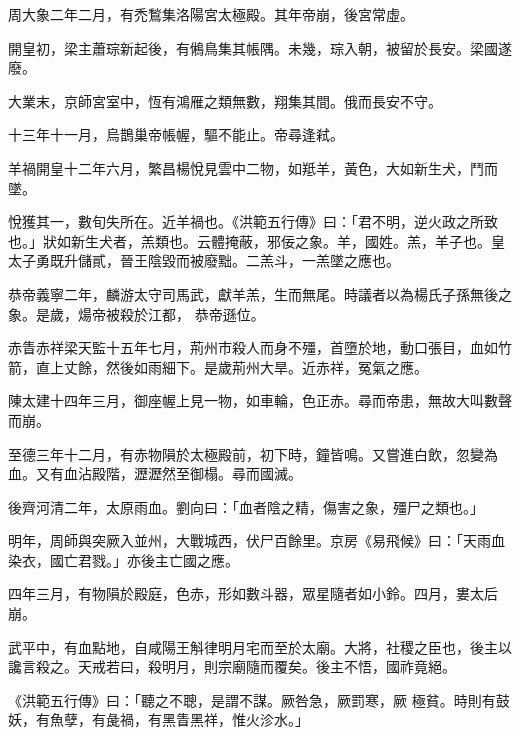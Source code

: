 \begin{pinyinscope}
 周大象二年二月，有禿鶖集洛陽宮太極殿。其年帝崩，後宮常虛。



 開皇初，梁主蕭琮新起後，有鵂鳥集其帳隅。未幾，琮入朝，被留於長安。梁國遂廢。



 大業末，京師宮室中，恆有鴻雁之類無數，翔集其間。俄而長安不守。



 十三年十一月，烏鵲巢帝帳幄，驅不能止。帝尋逢弒。



 羊禍開皇十二年六月，繁昌楊悅見雲中二物，如羝羊，黃色，大如新生犬，鬥而墜。



 悅獲其一，數旬失所在。近羊禍也。《洪範五行傳》曰：「君不明，逆火政之所致也。」狀如新生犬者，羔類也。云體掩蔽，邪佞之象。羊，國姓。羔，羊子也。皇太子勇既升儲貳，晉王陰毀而被廢黜。二羔斗，一羔墜之應也。



 恭帝義寧二年，麟游太守司馬武，獻羊羔，生而無尾。時議者以為楊氏子孫無後之象。是歲，煬帝被殺於江都，
 恭帝遜位。



 赤眚赤祥梁天監十五年七月，荊州市殺人而身不殭，首墮於地，動口張目，血如竹箭，直上丈餘，然後如雨細下。是歲荊州大旱。近赤祥，冤氣之應。



 陳太建十四年三月，御座幄上見一物，如車輪，色正赤。尋而帝患，無故大叫數聲而崩。



 至德三年十二月，有赤物隕於太極殿前，初下時，鐘皆鳴。又嘗進白飲，忽變為血。又有血沾殿階，瀝瀝然至御榻。尋而國滅。



 後齊河清二年，太原雨血。劉向曰：「血者陰之精，傷害之象，殭尸之類也。」



 明年，周師與突厥入並州，大戰城西，伏尸百餘里。京房《易飛候》曰：「天雨血染衣，國亡君戮。」亦後主亡國之應。



 四年三月，有物隕於殿庭，色赤，形如數斗器，眾星隨者如小鈴。四月，婁太后崩。



 武平中，有血點地，自咸陽王斛律明月宅而至於太廟。大將，社稷之臣也，後主以讒言殺之。天戒若曰，殺明月，則宗廟隨而覆矣。後主不悟，國祚竟絕。



 《洪範五行傳》曰：「聽之不聰，是謂不謀。厥咎急，厥罰寒，厥
 極貧。時則有鼓妖，有魚孽，有彘禍，有黑眚黑祥，惟火沴水。」




\end{pinyinscope}
